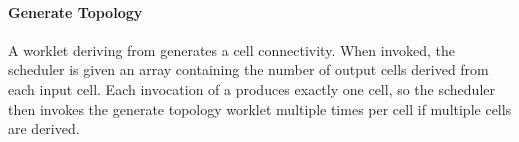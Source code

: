 
\paragraph{Generate Topology}


A worklet deriving from  generates a cell
connectivity. When invoked, the scheduler is given an array containing the
number of output cells derived from each input cell. Each invocation of a
 produces exactly one cell, so the
scheduler then invokes the generate topology worklet multiple times per
cell if multiple cells are derived.

